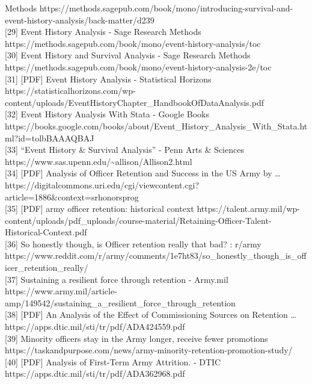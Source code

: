 \documentclass[./main.tex]{subfiles}
\begin{document}
Methods
https://methods.sagepub.com/book/mono/introducing-survival-and-event-history-analysis/back-matter/d239\\
{[}29{]} Event History Analysis - Sage Research Methods
https://methods.sagepub.com/book/mono/event-history-analysis/toc\\
{[}30{]} Event History and Survival Analysis - Sage Research Methods
https://methods.sagepub.com/book/mono/event-history-analysis-2e/toc\\
{[}31{]} {[}PDF{]} Event History Analysis - Statistical Horizons
https://statisticalhorizons.com/wp-content/uploads/EventHistoryChapter\_HandbookOfDataAnalysis.pdf\\
{[}32{]} Event History Analysis With Stata - Google Books
https://books.google.com/books/about/Event\_History\_Analysis\_With\_Stata.html?id=tolbBAAAQBAJ\\
{[}33{]} ``Event History \& Survival Analysis'' - Penn Arts \& Sciences
https://www.sas.upenn.edu/\textasciitilde allison/Allison2.html\\
{[}34{]} {[}PDF{]} Analysis of Officer Retention and Success in the US
Army by \ldots{}
https://digitalcommons.uri.edu/cgi/viewcontent.cgi?article=1886\&context=srhonorsprog\\
{[}35{]} {[}PDF{]} army officer retention: historical context
https://talent.army.mil/wp-content/uploads/pdf\_uploads/course-material/Retaining-Officer-Talent-Historical-Context.pdf\\
{[}36{]} So honestly though, is Officer retention really that bad? :
r/army
https://www.reddit.com/r/army/comments/1e7ht83/so\_honestly\_though\_is\_officer\_retention\_really/\\
{[}37{]} Sustaining a resilient force through retention - Army.mil
https://www.army.mil/article-amp/149542/sustaining\_a\_resilient\_force\_through\_retention\\
{[}38{]} {[}PDF{]} An Analysis of the Effect of Commissioning Sources on
Retention \ldots{} https://apps.dtic.mil/sti/tr/pdf/ADA424559.pdf\\
{[}39{]} Minority officers stay in the Army longer, receive fewer
promotions
https://taskandpurpose.com/news/army-minority-retention-promotion-study/\\
{[}40{]} {[}PDF{]} Analysis of First-Term Army Attrition. - DTIC
https://apps.dtic.mil/sti/tr/pdf/ADA362968.pdf\\
\end{document}
